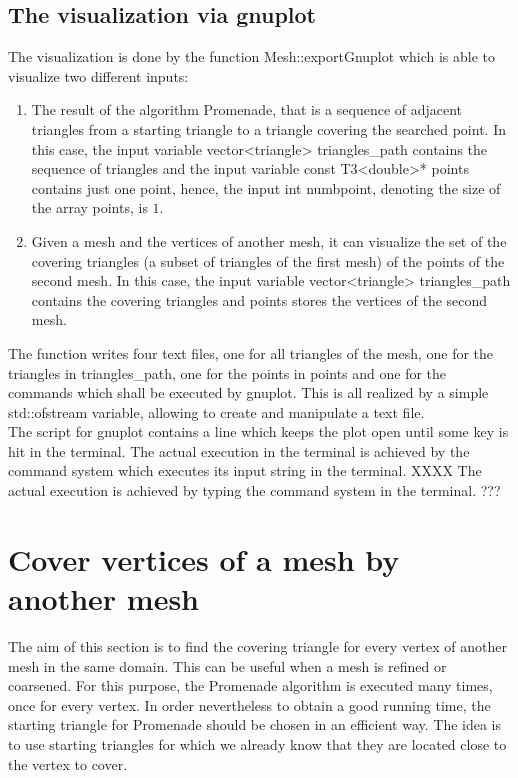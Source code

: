 \documentclass[10pt]{article}
\begin{document}
\subsection{The visualization via gnuplot} \label{visualization}
	The visualization is done by the function {\ttfamily Mesh::exportGnuplot} which is able to visualize two different inputs: 
	\begin{enumerate}
		\item 
		The result of the algorithm Promenade, that is a sequence of adjacent triangles from a starting triangle to a triangle covering the searched point. 
		In this case, the input variable {\ttfamily vector<triangle> triangles\_path} contains the sequence of triangles and the input variable {\ttfamily const T3<double>* points} contains just one point, hence, the input {\ttfamily int numbpoint}, denoting the size of the array {\ttfamily points}, is $ 1 $. 
		\item 
		Given a mesh and the vertices of another mesh, it can visualize the set of the covering triangles (a subset of triangles of the first mesh) of the points of the second mesh. 
		In this case, the input variable {\ttfamily vector<triangle> triangles\_path} contains the covering triangles and {\ttfamily points} stores the vertices of the second mesh. 
	\end{enumerate}
The function writes four text files, one for all triangles of the mesh, one for the triangles in {\ttfamily triangles\_path}, one for the points in {\ttfamily points} and one for the commands which shall be executed by gnuplot. This is all realized by a simple {\ttfamily std::ofstream} variable, allowing to create and manipulate a text file. \\
The script for gnuplot contains a line which keeps the plot open until some key is hit in the terminal. 
The actual execution in the terminal is achieved by the command {\ttfamily system} which executes its input string in the terminal. XXXX The actual execution is achieved by typing the command {\ttfamily system} in the terminal. ???

\section{Cover vertices of a mesh by another mesh}

The aim of this section is to find the covering triangle for every vertex of another mesh in the same domain. This can be useful when a mesh is refined or coarsened. For this purpose, the Promenade algorithm is executed many times, once for every vertex. In order nevertheless to obtain a good running time, the starting triangle for {\ttfamily Promenade} should be chosen in an efficient way. The idea is to use starting triangles for which we already know that they are located close to the vertex to cover.
\end{document}

